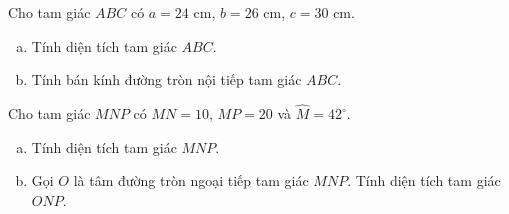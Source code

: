 \begin{bt}%
	Cho tam giác $ABC$ có $a=24$ cm, $b=26$ cm, $c=30$ cm.
	\begin{enumerate}[a)]
		\item Tính diện tích tam giác $ABC$.
		\item  Tính bán kính đường tròn nội tiếp tam giác $ABC$.
	\end{enumerate}
\end{bt}

\begin{bt}%
	Cho tam giác $MNP$ có $MN=10$, $MP=20$ và $\widehat{M}=42^\circ$.
	\begin{enumerate}[a)]
		\item Tính diện tích tam giác $MNP$.
		\item Gọi $O$ là tâm đường tròn ngoại tiếp tam giác $MNP$. Tính diện tích tam giác $ONP$.
	\end{enumerate}
\end{bt}

